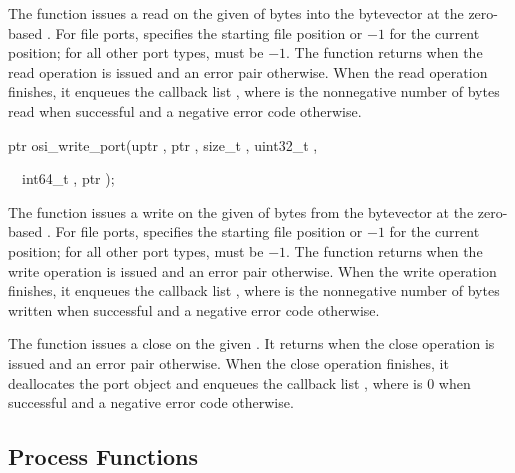 The  function issues a read on the given
 of  bytes into the bytevector  at the
zero-based . For file ports,  specifies
the starting file position or $-1$ for the current position; for all
other port types,  must be $-1$.  The function returns
 when the read operation is issued and an error pair
otherwise. When the read operation finishes, it enqueues the callback
list , where  is the
nonnegative number of bytes read when successful and a negative error
code otherwise.

\begin{function}
\codebegin
ptr osi\_write\_port(uptr , ptr , size\_t , uint32\_t ,\strut
       \      \      int64\_t , ptr );\strut
\codeend\end{function}

The  function issues a write on the given
 of  bytes from the bytevector  at the
zero-based . For file ports,  specifies
the starting file position or $-1$ for the current position; for all
other port types,  must be $-1$.  The function returns
 when the write operation is issued and an error pair
otherwise. When the write operation finishes, it enqueues the callback
list , where  is the
nonnegative number of bytes written when successful and a negative
error code otherwise.

\begin{function}
\end{function}

The  function issues a close on the given
. It returns  when the close operation is issued
and an error pair otherwise. When the close operation finishes, it
deallocates the port object and enqueues the callback list
, where  is 0 when
successful and a negative error code otherwise.

\subsection {Process Functions}

